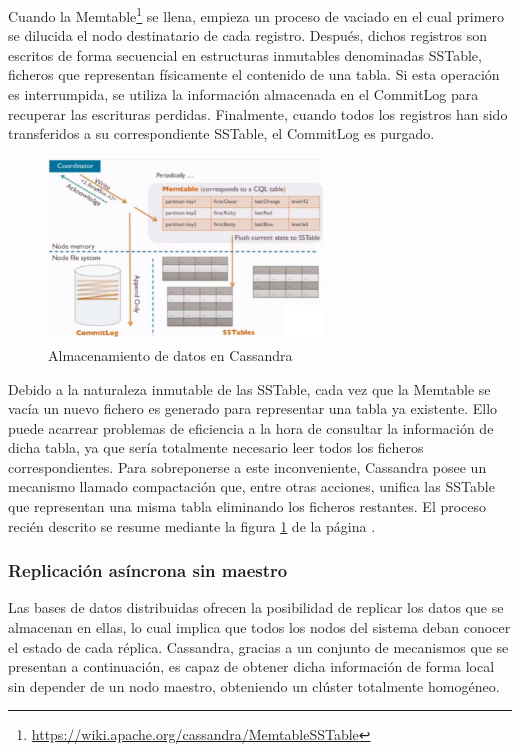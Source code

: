Cuando la Memtable\footnote{\url{https://wiki.apache.org/cassandra/MemtableSSTable}} se llena, empieza un proceso de vaciado en el cual primero se dilucida el nodo destinatario de cada registro. Después, dichos registros son escritos de forma secuencial en estructuras inmutables denominadas SSTable, ficheros que representan físicamente el contenido de una tabla. Si esta operación es interrumpida, se utiliza la información almacenada en el CommitLog para recuperar las escrituras perdidas. Finalmente, cuando todos los registros han sido transferidos a su correspondiente SSTable, el CommitLog es purgado.

\begin{figure}[h]
	\centering
	\includegraphics[width=0.65\textwidth]{Ilustraciones/cassandra_data_storage.png}
	\caption{Almacenamiento de datos en Cassandra}
	\label{fig:almacenamiento_cassandra}
\end{figure}

Debido a la naturaleza inmutable de las SSTable, cada vez que la Memtable se vacía un nuevo fichero es generado para representar una tabla ya existente. Ello puede acarrear problemas de eficiencia a la hora de consultar la información de dicha tabla, ya que sería totalmente necesario leer todos los ficheros correspondientes. Para sobreponerse a este inconveniente, Cassandra posee un mecanismo llamado compactación que, entre otras acciones, unifica las SSTable que representan una misma tabla eliminando los ficheros restantes. El proceso recién descrito se resume mediante la figura \ref{fig:almacenamiento_cassandra} de la página \pageref{fig:almacenamiento_cassandra}.

\subsubsection{Replicación asíncrona sin maestro}

Las bases de datos distribuidas ofrecen la posibilidad de replicar los datos que se almacenan en ellas, lo cual implica que todos los nodos del sistema deban conocer el estado de cada réplica. Cassandra, gracias a un conjunto de mecanismos que se presentan a continuación, es capaz de obtener dicha información de forma local sin depender de un nodo maestro, obteniendo un clúster totalmente homogéneo.\\

